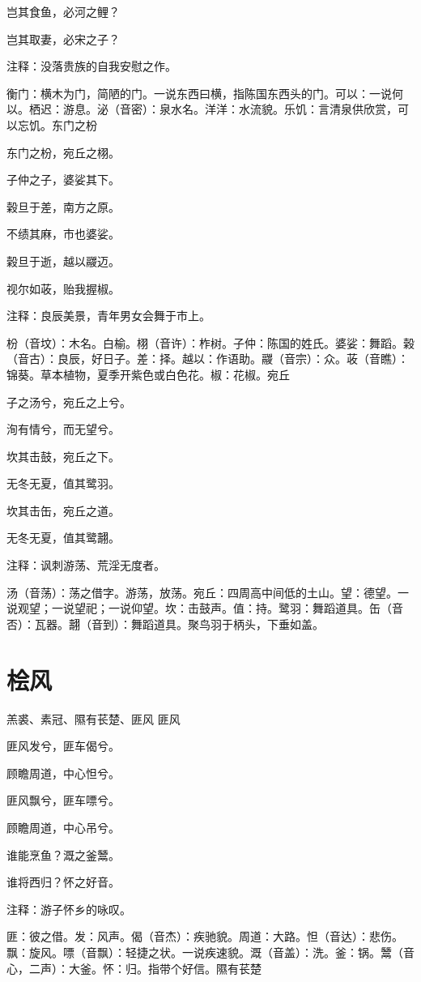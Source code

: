 \documentclass[12pt,UTF8]{ctexbook}
\begin{document}
岂其食鱼，必河之鲤？

岂其取妻，必宋之子？

注释：没落贵族的自我安慰之作。

衡门：横木为门，简陋的门。一说东西曰横，指陈国东西头的门。可以：一说何以。栖迟：游息。泌（音密）：泉水名。洋洋：水流貌。乐饥：言清泉供欣赏，可以忘饥。东门之枌

东门之枌，宛丘之栩。

子仲之子，婆娑其下。

榖旦于差，南方之原。

不绩其麻，市也婆娑。

榖旦于逝，越以鬷迈。

视尔如荍，贻我握椒。

注释：良辰美景，青年男女会舞于市上。

枌（音坟）：木名。白榆。栩（音许）：柞树。子仲：陈国的姓氏。婆娑：舞蹈。榖（音古）：良辰，好日子。差：择。越以：作语助。鬷（音宗）：众。荍（音瞧）：锦葵。草本植物，夏季开紫色或白色花。椒：花椒。宛丘

子之汤兮，宛丘之上兮。

洵有情兮，而无望兮。

坎其击鼓，宛丘之下。

无冬无夏，值其鹭羽。

坎其击缶，宛丘之道。

无冬无夏，值其鹭翿。

注释：讽刺游荡、荒淫无度者。

汤（音荡）：荡之借字。游荡，放荡。宛丘：四周高中间低的土山。望：德望。一说观望；一说望祀；一说仰望。坎：击鼓声。值：持。鹭羽：舞蹈道具。缶（音否）：瓦器。翿（音到）：舞蹈道具。聚鸟羽于柄头，下垂如盖。



\part{桧风}
羔裘、素冠、隰有苌楚、匪风
匪风

匪风发兮，匪车偈兮。

顾瞻周道，中心怛兮。

匪风飘兮，匪车嘌兮。

顾瞻周道，中心吊兮。

谁能烹鱼？溉之釜鬵。

谁将西归？怀之好音。

注释：游子怀乡的咏叹。

匪：彼之借。发：风声。偈（音杰）：疾驰貌。周道：大路。怛（音达）：悲伤。飘：旋风。嘌（音飘）：轻捷之状。一说疾速貌。溉（音盖）：洗。釜：锅。鬵（音心，二声）：大釜。怀：归。指带个好信。隰有苌楚
\end{document}
